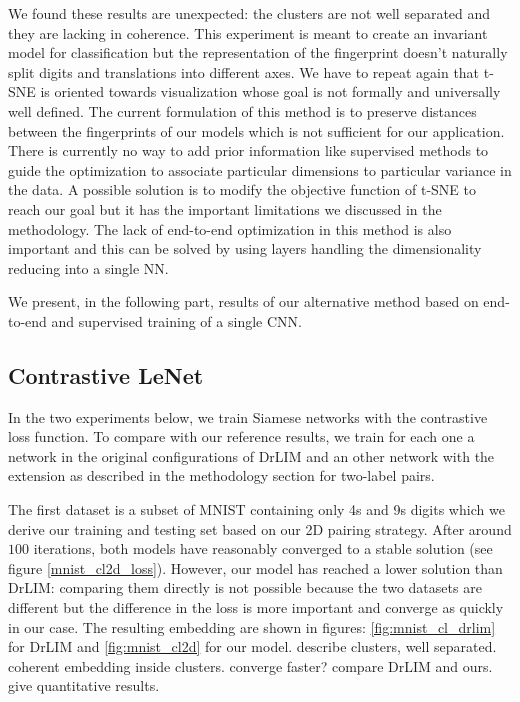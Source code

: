\documentclass[a4paper,12pt]{report}
\begin{document}
We found these results are unexpected: the clusters are not well separated and they are lacking in coherence.
This experiment is meant to create an invariant model for classification but the representation of the fingerprint doesn't naturally split digits and translations into different axes.
We have to repeat again that t-SNE is oriented towards visualization whose goal is not formally and universally well defined.
The current formulation of this method is to preserve distances between the fingerprints of our models which is not sufficient for our application.
There is currently no way to add prior information like supervised methods to guide the optimization to associate particular dimensions to particular variance in the data.
A possible solution is to modify the objective function of t-SNE to reach our goal but it has the important limitations we discussed in the methodology.
The lack of end-to-end optimization in this method is also important and this can be solved by using layers handling the dimensionality reducing into a single NN.

We present, in the following part, results of our alternative method based on end-to-end and supervised training of a single CNN.

\subsection{Contrastive LeNet}

In the two experiments below, we train Siamese networks with the contrastive loss function.
To compare with our reference results, we train for each one a network in the original configurations of DrLIM and an other network with the extension as described in the methodology section for two-label pairs.

The first dataset is a subset of MNIST containing only 4s and 9s digits which we derive our training and testing set based on our 2D pairing strategy.
After around $100$ iterations, both models have reasonably converged to a stable solution (see figure \ref{mnist_cl2d_loss}).
However, our model has reached a lower solution than DrLIM: comparing them directly is not possible because the two datasets are different but the difference in the loss is more important and converge as quickly in our case.
The resulting embedding are shown in figures: \ref{fig:mnist_cl_drlim} for DrLIM and \ref{fig:mnist_cl2d} for our model.
describe clusters, well separated.
coherent embedding inside clusters.
converge faster?
compare DrLIM and ours.
give quantitative results.
\end{document}
